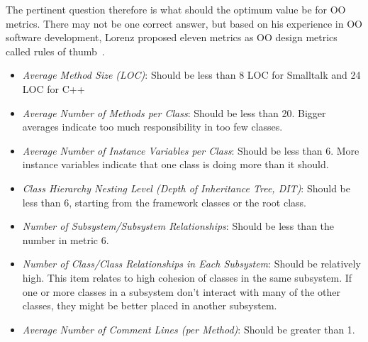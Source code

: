 \documentclass[sle]{llncs}
\begin{document}
The pertinent question therefore is what should the optimum value be for OO metrics. There may not be one correct answer,
but based on his experience in OO software development, Lorenz proposed eleven metrics as OO design metrics called rules of thumb~\cite{lorenz1994object}.
\begin{itemize}
\item \emph{Average Method Size (LOC)}: Should be less than 8 LOC for Smalltalk and 24 LOC for C++ 
\item \emph{Average Number of Methods per Class}: Should be less than 20. Bigger averages indicate too much responsibility in too few classes. 
\item \emph{Average Number of Instance Variables per Class}: Should be less than 6. More instance variables indicate that one class is doing more than it should. 
\item \emph{Class Hierarchy Nesting Level (Depth of Inheritance Tree, DIT)}: Should be less than 6, starting from the framework classes or the root class. 
\item \emph{Number of Subsystem/Subsystem Relationships}: Should be less than the number in metric 6. 
\item \emph{Number of Class/Class Relationships in Each Subsystem}: Should be relatively high. This item relates to high cohesion of classes in the same subsystem. If one or more classes in a subsystem don't interact with many of the other classes, they might be better placed in another subsystem. 
\item \emph{Average Number of Comment Lines (per Method)}: Should be greater than 1. 
\end{itemize}


\end{document}
